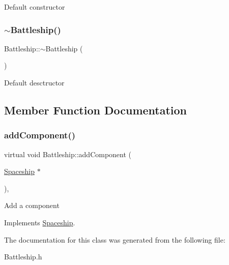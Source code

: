 Default constructor \mbox{\label{classBattleship_a89425138ec38aec5ea9da7889445dc27}} 
\subsubsection{\texorpdfstring{$\sim$\+Battleship()}{~Battleship()}}
{\footnotesize\ttfamily Battleship\+::$\sim$\+Battleship (\begin{DoxyParamCaption}{ }\end{DoxyParamCaption})\hspace{0.3cm}{\ttfamily [inline]}}

Default desctructor 

\subsection{Member Function Documentation}
\mbox{\label{classBattleship_a975ecf4aaef329705c1e1b3a4584a302}} 
\subsubsection{\texorpdfstring{add\+Component()}{addComponent()}}
{\footnotesize\ttfamily virtual void Battleship\+::add\+Component (\begin{DoxyParamCaption}\item[{\hyperlink{classSpaceship}{Spaceship} $\ast$}]{ }\end{DoxyParamCaption})\hspace{0.3cm}{\ttfamily [inline]}, {\ttfamily [virtual]}}

Add a component 

Implements \hyperlink{classSpaceship_ac1b4673a691cd100708ddea08cd9f192}{Spaceship}.



The documentation for this class was generated from the following file\+:\begin{DoxyCompactItemize}
\item 
Battleship.\+h\end{DoxyCompactItemize}
